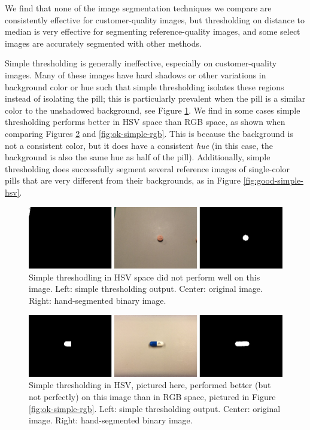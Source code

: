 \documentclass{article}
\begin{document}
We find that none of the image segmentation techniques we compare are consistently effective for customer-quality images, but thresholding on distance to median is very effective for segmenting reference-quality images, and some select images are accurately segmented with other methods.

Simple thresholding is generally ineffective, especially on customer-quality images. Many of these images have hard shadows or other variations in background color or hue such that simple thresholding isolates these regions instead of isolating the pill; this is particularly prevalent when the pill is a similar color to the unshadowed background, see Figure \ref{fig:bad-simple-hsv}. We find in some cases simple thresholding performs better in HSV space than RGB space, as shown when comparing Figures \ref{fig:ok-simple-hsv} and \ref{fig:ok-simple-rgb}. This is because the background is not a consistent color, but it does have a consistent \textit{hue} (in this case, the background is also the same hue as half of the pill). Additionally, simple thresholding does successfully segment several reference images of single-color pills that are very different from their backgrounds, as in Figure \ref{fig:good-simple-hsv}.

\begin{figure}
    \includegraphics[width=\linewidth]{images/simple_hsv_bad.jpg}
    \caption{Simple threshodling in HSV space did not perform well on this image. Left: simple thresholding output. Center: original image. Right: hand-segmented binary image.}
    \label{fig:bad-simple-hsv}
\end{figure}

\begin{figure}
    \includegraphics[width=\linewidth]{images/simple_hsv_ok.jpg}
    \caption{Simple thresholding in HSV, pictured here, performed better (but not perfectly) on this image than in RGB space, pictured in Figure \ref{fig:ok-simple-rgb}. Left: simple thresholding output. Center: original image. Right: hand-segmented binary image.}
    \label{fig:ok-simple-hsv}
\end{figure}
\end{document}
